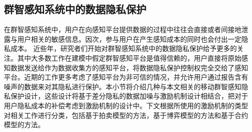 \subsection{群智感知系统中的数据隐私保护}
在群智感知系统中，用户在向感知平台提供数据的过程中往往会直接或者间接地泄露与用户相关的敏感信息。因次，参与用户在产生感知成本的同时也会付出一定隐私成本。
近些年，研究者们开始对群智感知系统中的数据隐私保护给予更多的关注\cite{christin2011survey,dandekar2014privacy,ghosh2015selling,jin2016inception,zhang2016privacy,wang2016value,gong2017truthful}。其中大多数工作\cite{christin2011survey,dandekar2014privacy,ghosh2015selling,jin2016inception,zhang2016privacy}在建模中假定群智感知平台是值得信赖的，用户直接将原始感知数据发送给作为数据收集方的感知平台，将数据隐私保护控制权完全交给了感知平台。近期的工作\cite{wang2016value,wang2016buying}更多考虑了感知平台为非可信的情况，并允许用户通过报告含有噪声的数据来对其隐私进行保护。本小节将介绍几种与本文相关的移动群智感知隐私保护设计，这些设计将基于差分隐私的数据加噪与激励机制设计相结合，把对于用户隐私成本的补偿考虑到激励机制的设计中。下文根据所使用的激励机制的类型对相关工作进行分类，包括基于{\kaishu 拍卖模型}的方法，基于{\kaishu 博弈模型}的方法和基于{\kaishu 合约模型}的方法。








